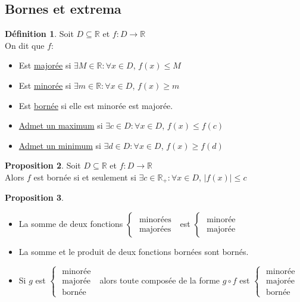 \documentclass[10pt,a4paper]{article}
\theoremstyle{definition}
\newtheorem{proposition}{Proposition}[section]
\newtheorem{definition}[proposition]{Définition}
\begin{document}
\subsection{Bornes et extrema}
\begin{definition}
Soit $D \subseteq \mathbb{R}$ et $f: D \to \mathbb{R}$ \\
On dit que $f$:
\begin{itemize}
\item Est \uline{majorée} si $\exists M \in \mathbb{R}: \forall x \in D$, $f(x) \leq M$
\item Est \uline{minorée} si $\exists m \in \mathbb{R}: \forall x \in D$, $f(x) \geq m$
\item Est \uline{bornée} si elle est minorée est majorée.
\item \uline{Admet un maximum} si $\exists c \in D: \forall x \in D$, $f(x) \leq f(c)$
\item \uline{Admet un minimum} si $\exists d \in D: \forall x \in D$, $f(x) \geq f(d)$
\end{itemize}
\end{definition}
\begin{proposition}
Soit $D \subseteq \mathbb{R}$ et $f: D \to \mathbb{R}$ \\
Alors $f$ est bornée si et seulement si $\exists c \in \mathbb{R}_+: \forall x \in D$, $\left| f(x) \right| \leq c$
\end{proposition}
\begin{proposition}
\hfill
\begin{itemize}
\item La somme de deux fonctions $\begin{cases}
\text{ minorées } \\
\text{ majorées }
\end{cases}$ est $\begin{cases}
\text{ minorée } \\
\text{ majorée }
\end{cases}$
\item La somme et le produit de deux fonctions bornées sont bornés.
\item Si $g$ est $\begin{cases}
\text{ minorée } \\
\text{ majorée } \\
\text{ bornée }
\end{cases}$ alors toute composée de la forme $g \circ f$ est $\begin{cases}
\text{ minorée } \\
\text{ majorée } \\
\text{ bornée}
\end{cases}$
\end{itemize}
\end{proposition}
\end{document}
